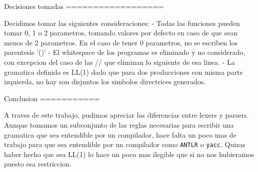 Decisiones tomadas
==================

Decidimos tomar las siguientes consideraciones:
- Todas las funciones  pueden tomar 0, 1 o 2 parametros, tomando valores por defecto en caso de que
    sean menos de 2 parametros. En el caso de tener 0 parametros, no se escriben los parentesis '()'
- El whitespace de los programas es eliminado y no considerado, con excepcion del caso de las // que
    eliminan lo siguiente de esa linea.
- La gramatica definida es LL(1) dado que para dos producciones con misma parte izquierda, no hay 
    son disjuntos los simbolos directrices generados.


Conclusion
===========

A traves de este trabajo, pudimos apreciar las diferencias entre lexers y parsers. Aunque tomamos un
subconjunto de las reglas necesarias para escribir una gramatica que sea entendible por un compilador,
hace falta un poco mas de trabajo para que sea entendible por un compilador como \texttt{ANTLR} o \texttt{yacc}. 
Quizas haber hecho que sea LL(1) lo hace un poco mas ilegible que si no nos hubieramos puesto esa restriccion.




